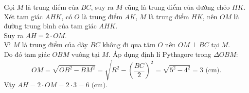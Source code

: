 \begin{bt}
{\begin{enumerate}[a)]
	Gọi $M$ là trung điểm của $BC$, suy ra $M$ cũng là trung điểm của đường chéo $HK$.\\
	Xét tam giác $AHK$, có $O$ là trung điểm $AK$, $M$ là trung điểm $HK$, nên $OM$ là đường trung bình của tam giác $AHK$.\\
	Suy ra $AH = 2 \cdot OM$.\\
	Vì $M$ là trung điểm của dây $BC$ không đi qua tâm $O$ nên $OM \perp BC$ tại $M$.\\
	Do đó tam giác $OBM$ vuông tại $M$. Áp dụng định lí Pythagore trong $\Delta OBM$:
	$$OM = \sqrt{OB^2 - BM^2} = \sqrt{R^2 - \left(\dfrac{BC}{2}\right)^2} = \sqrt{5^2 - 4^2} = 3\text{ (cm)}.$$
	Vậy $AH = 2 \cdot OM = 2 \cdot 3 = 6\text{ (cm)}$.
\end{enumerate}
}
\end{bt}



